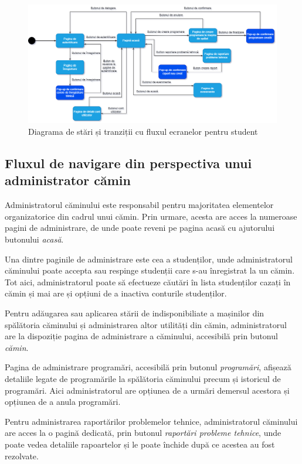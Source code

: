 \documentclass[12pt,a4paper]{report}
\theoremstyle{definition}
\theoremstyle{remark}
\begin{document}
\begin{figure}[H]
    \centering
    \includegraphics[width=0.75\linewidth]{resurse/diagrame/diagrama_de_navigare1.1.drawio.png}
    \caption{Diagrama de stări și tranziții cu fluxul ecranelor pentru student}
\end{figure}

\subsection{Fluxul de navigare din perspectiva unui administrator cămin}
\par Administratorul căminului este responsabil pentru majoritatea elementelor organizatorice din cadrul unui cămin. Prin urmare, acesta are acces la numeroase pagini de administrare, de unde poate reveni pe pagina acasă cu ajutorului butonului {\itshape acasă}.

\par Una dintre paginile de administrare este cea a studenților, unde administratorul căminului poate accepta sau respinge studenții care s-au înregistrat la un cămin. Tot aici, administratorul poate să efectueze căutări în lista studenților cazați în cămin și mai are și opțiuni de a inactiva conturile studenților.

\par Pentru adăugarea sau aplicarea stării de indisponibiliate a mașinilor din spălătoria căminului și administrarea altor utilități din cămin, administratorul are la dispoziție pagina de administrare a căminului, accesibilă prin butonul {\itshape cămin}.

\par Pagina de administrare programări, accesibilă prin butonul {\itshape programări}, afișează detaliile legate de programările la spălătoria căminului precum și istoricul de programări. Aici administratorul are opțiunea de a urmări demersul acestora și opțiunea de a anula programări.

\par Pentru administrarea raportărilor problemelor tehnice, administratorul căminului are acces la o pagină dedicată, prin butonul {\itshape raportări probleme tehnice}, unde poate vedea detaliile rapoartelor și le poate închide după ce acestea au fost rezolvate.
\end{document}
